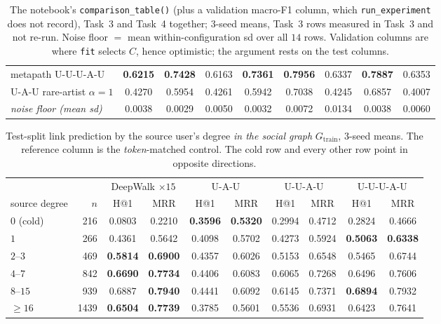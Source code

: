 \begin{table}[htbp]
\begin{tabular}{@{}lcccccccc@{}}
metapath \textsf{U-U-U-A-U} & \textbf{0.6215} & \textbf{0.7428} & 0.6163 & \textbf{0.7361} & \textbf{0.7956} & 0.6337 & \textbf{0.7887} & 0.6353 \\
\textsf{U-A-U} rare-artist $\alpha{=}1$ & 0.4270 & 0.5954 & 0.4261 & 0.5942 & 0.7038 & 0.4245 & 0.6857 & 0.4007 \\
\midrule
\textit{noise floor (mean sd)} & 0.0038 & 0.0029 & 0.0050 & 0.0032 & 0.0072 & 0.0134 & 0.0038 & 0.0060 \\
\bottomrule
\end{tabular}
\caption{The notebook's \texttt{comparison\_table()} (plus a validation macro-F1 column,
which \texttt{run\_experiment} does not record), Task~3 and Task~4 together; $3$-seed
means, Task~3 rows measured in Task~3 and not re-run.  Noise floor $=$ mean
within-configuration sd over all $14$ rows.  Validation columns are where \texttt{fit}
selects $C$, hence optimistic; the argument rests on the test columns.}
\label{p2:tab:main}
\end{table}

\begin{table}[htbp]
\centering\footnotesize
\setlength{\tabcolsep}{4.5pt}
\begin{tabular}{@{}lrcccccccc@{}}
\toprule
& & \multicolumn{2}{c}{DeepWalk $\times15$} & \multicolumn{2}{c}{\textsf{U-A-U}}
  & \multicolumn{2}{c}{\textsf{U-U-A-U}} & \multicolumn{2}{c}{\textsf{U-U-U-A-U}} \\
\cmidrule(lr){3-4}\cmidrule(lr){5-6}\cmidrule(lr){7-8}\cmidrule(lr){9-10}
source degree & $n$ & H@1 & MRR & H@1 & MRR & H@1 & MRR & H@1 & MRR \\
\midrule
$0$ (cold) & 216 & 0.0803 & 0.2210 & \textbf{0.3596} & \textbf{0.5320} & 0.2994 & 0.4712 & 0.2824 & 0.4666 \\
$1$ & 266 & 0.4361 & 0.5642 & 0.4098 & 0.5702 & 0.4273 & 0.5924 & \textbf{0.5063} & \textbf{0.6338} \\
$2$--$3$ & 469 & \textbf{0.5814} & \textbf{0.6900} & 0.4357 & 0.6026 & 0.5153 & 0.6548 & 0.5465 & 0.6744 \\
$4$--$7$ & 842 & \textbf{0.6690} & \textbf{0.7734} & 0.4406 & 0.6083 & 0.6065 & 0.7268 & 0.6496 & 0.7606 \\
$8$--$15$ & 939 & 0.6887 & \textbf{0.7940} & 0.4441 & 0.6092 & 0.6145 & 0.7371 & \textbf{0.6894} & 0.7932 \\
$\ge 16$ & 1439 & \textbf{0.6504} & \textbf{0.7739} & 0.3785 & 0.5601 & 0.5536 & 0.6931 & 0.6423 & 0.7641 \\
\bottomrule
\end{tabular}
\caption{Test-split link prediction by the source user's degree \emph{in the social graph}
$G_{\mathrm{train}}$, $3$-seed means.  The reference column is the \emph{token}-matched
control.  The cold row and every other row point in opposite directions.}
\label{p2:tab:degree}
\end{table}

